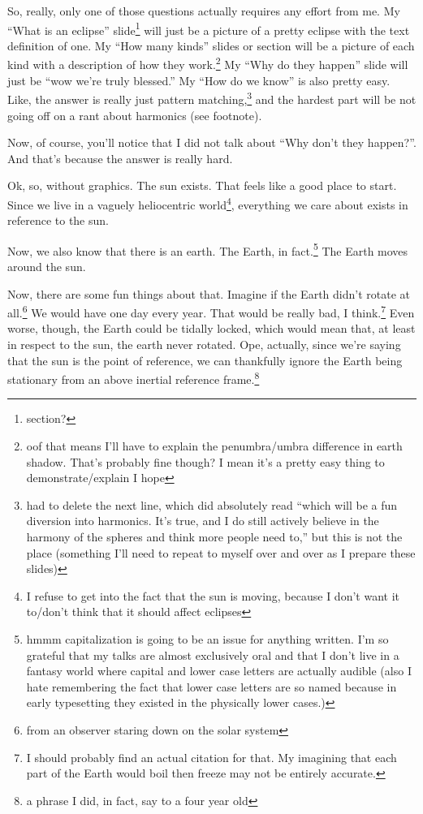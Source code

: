 \documentclass[12pt]{article}[titlepage]
\newcommand{\say}[1]{``#1''}
\newcommand{\1}{\={a}}
\newcommand{\2}{\={e}}
\newcommand{\3}{\={\i}}
\newcommand{\4}{\=o}
\newcommand{\5}{\=u}
\newcommand{\6}{\={A}}
\renewcommand{\,}{\textsuperscript{,}}
\begin{document}
So, really, only one of those questions actually requires any effort from me.
My \say{What is an eclipse} slide\footnote{section?} will just be a picture of a pretty eclipse with the text definition of one.
My \say{How many kinds} slides or section will be a picture of each kind with a description of how they work.\footnote{oof that means I'll have to explain the penumbra/umbra difference in earth shadow. That's probably fine though? I mean it's a pretty easy thing to demonstrate/explain I hope}
My \say{Why do they happen} slide will just be \say{wow we're truly blessed.}
My \say{How do we know} is also pretty easy.
Like, the answer is really just pattern matching,\footnote{had to delete the next line, which did absolutely read \say{which will be a fun diversion into harmonics. It's true, and I do still actively believe in the harmony of the spheres and think more people need to,} but this is not the place (something I'll need to repeat to myself over and over as I prepare these slides)} and the hardest part will be not going off on a rant about harmonics (see footnote).

Now, of course, you'll notice that I did not talk about \say{Why don't they happen?}.
And that's because the answer is really hard.

Ok, so, without graphics.
The sun exists.
That feels like a good place to start.
Since we live in a vaguely heliocentric world\footnote{I refuse to get into the fact that the sun is moving, because I don't want it to/don't think that it should affect eclipses}, everything we care about exists in reference to the sun.

Now, we also know that there is an earth.
The Earth, in fact.\footnote{hmmm capitalization is going to be an issue for anything written. I'm so grateful that my talks are almost exclusively oral and that I don't live in a fantasy world where capital and lower case letters are actually audible (also I hate remembering the fact that lower case letters are so named because in early typesetting they existed in the physically lower cases.)}
The Earth moves around the sun.

Now, there are some fun things about that.
Imagine if the Earth didn't rotate at all.\footnote{from an observer staring down on the solar system}
We would have one day every year.
That would be really bad, I think.\footnote{I should probably find an actual citation for that. My imagining that each part of the Earth would boil then freeze may not be entirely accurate.}
Even worse, though, the Earth could be tidally locked, which would mean that, at least in respect to the sun, the earth never rotated.
Ope, actually, since we're saying that the sun is the point of reference, we can thankfully ignore the Earth being stationary from an above inertial reference frame.\footnote{a phrase I did, in fact, say to a four year old}
\end{document}
